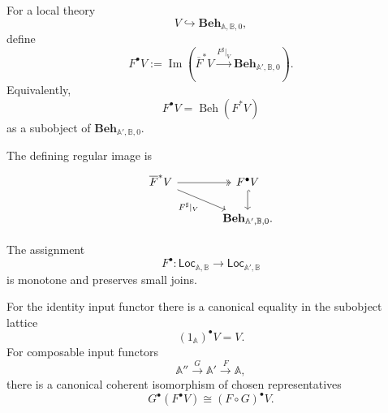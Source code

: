 \begin{definition}
\label{def:to-Fbullet}
    For a local theory
    \[
        V\hookrightarrow
        \mathbf{Beh}_{\mathbb A,\mathbb B,0},
    \]
    define
    \[
        F^\bullet V
        :=
        \operatorname{Im}
        \left(
            \overline F^*V
            \xrightarrow{F^\sharp|_V}
            \mathbf{Beh}_{\mathbb A',\mathbb B,0}
        \right).
    \]
    Equivalently,
    \[
        F^\bullet V
        =
        \operatorname{Beh}(F^*V)
    \]
    as a subobject of
    \(\mathbf{Beh}_{\mathbb A',\mathbb B,0}\).
\end{definition}

The defining regular image is
\[
\begin{tikzcd}[column sep=large]
    \overline F^*V
        \arrow[r, two heads]
        \arrow[dr, "F^\sharp|_V"']
    &
    F^\bullet V
        \arrow[d, hook]
    \\
    &
    \mathbf{Beh}_{\mathbb A',\mathbb B,0}.
\end{tikzcd}
\]

\begin{proposition}
\label{prop:to-Fbullet-properties}
    The assignment
    \[
        F^\bullet:
        \mathsf{Loc}_{\mathbb A,\mathbb B}
        \to
        \mathsf{Loc}_{\mathbb A',\mathbb B}
    \]
    is monotone and preserves small joins.

    For the identity input functor there is a canonical equality in the
    subobject lattice
    \[
        (1_{\mathbb A})^\bullet V=V.
    \]
    For composable input functors
    \[
        \mathbb A''
        \xrightarrow{G}
        \mathbb A'
        \xrightarrow{F}
        \mathbb A,
    \]
    there is a canonical coherent isomorphism of chosen representatives
    \[
        G^\bullet(F^\bullet V)
        \cong
        (F\circ G)^\bullet V.
    \]
\end{proposition}


